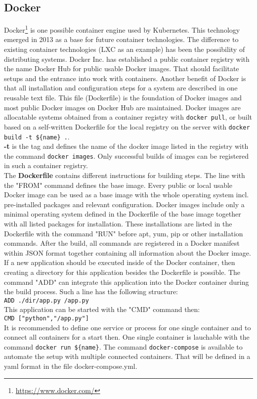 \subsection{Docker}

Docker\footnote{\url{https://www.docker.com/}} is one possible container engine used by Kubernetes. This technology emerged in 2013 as a base for future container technologies. 
The difference to existing container technologies (LXC as an example) has been the possibility of distributing systems. 
Docker Inc. has established a public container registry with the name Docker Hub for public usable Docker images. That should facilitate setups and the entrance into work with containers. Another benefit of Docker is that all installation and configuration steps for a system are described in one reusable text file. 
This file (Dockerfile) is the foundation of Docker images and most public Docker images on Docker Hub are maintained.
Docker images are allocatable systems obtained from a container registry with \lstinline!docker pull!, or built based on a self-written Dockerfile for the local registry on the server with \lstinline!docker build -t ${name} .!. \\ \textbf{-t} is the tag and defines the name of the docker image listed in the registry with the command \lstinline!docker images!. Only successful builds of images can be registered in such a container registry. \\
The \textbf{Dockerfile} contains different instructions for building steps. The line with the "FROM" command defines the base image. Every public or local usable Docker image can be used as a base image with the whole operating system incl. pre-installed packages and relevant configuration. Docker images include only a minimal operating system defined in the Dockerfile of the base image together with all listed packages for installation. These installations are listed in the Dockerfile with the command "RUN" before apt, yum, pip or other installation commands. 
After the build, all commands are registered in a Docker manifest within JSON format together containing all information about the Docker image.
If a new application should be executed inside of the Docker container, then creating a directory for this application besides the Dockerfile is possible. The command "ADD" can integrate this application into the Docker container during the build process. Such a line has the following structure: \\
\lstinline!ADD ./dir/app.py /app.py! \\
This application can be started with the "CMD" command then: \\
\lstinline!CMD ["python","/app.py"]! \\
It is recommended to define one service or process for one single container and to connect all containers for a start then. One single container is lauchable with the command \lstinline!docker run ${name}!. 
The command \lstinline!docker-compose! is available to automate the setup with multiple connected containers. That will be defined in a yaml format in the file docker-compose.yml.

